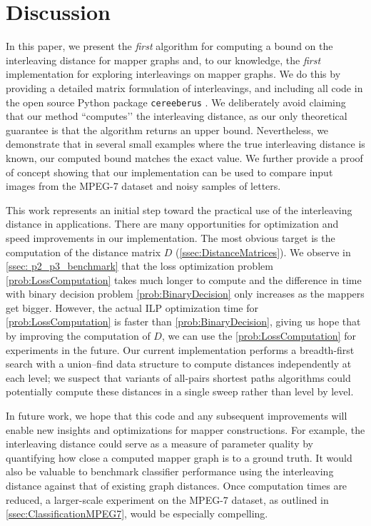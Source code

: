 \section{Discussion}
\label{sec:discussion}

In this paper, we present the \emph{first} algorithm for computing a bound on the interleaving distance for mapper graphs and, to our knowledge, the \emph{first} implementation for exploring interleavings on mapper graphs. 
We do this by providing a detailed matrix formulation of interleavings, and including all code in the open source Python package \texttt{cereeberus} \cite{cereeberus}.
We deliberately avoid claiming that our method “computes’’ the interleaving distance, as our only theoretical guarantee is that the algorithm returns an upper bound. 
Nevertheless, we demonstrate that in several small examples where the true interleaving distance is known, our computed bound matches the exact value. 
We further provide a proof of concept showing that our implementation can be used to compare input images from the MPEG-7 dataset and noisy samples of letters.

This work represents an initial step toward the practical use of the interleaving distance in applications. 
There are many opportunities for optimization and speed improvements in our implementation. 
The most obvious target is the computation of the distance matrix $D$ (\cref{ssec:DistanceMatrices}). 
We observe in \cref{ssec: p2_p3_benchmark} that the loss optimization problem \cref{prob:LossComputation} takes much longer to compute and the difference in time with binary decision problem \cref{prob:BinaryDecision} only increases as the mappers get bigger.
However, the actual ILP optimization time for \cref{prob:LossComputation} is faster than \cref{prob:BinaryDecision}, giving us hope that by improving the computation of $D$, we can use the \cref{prob:LossComputation} for experiments in the future. 
Our current implementation performs a breadth-first search with a union–find data structure to compute distances independently at each level; we suspect that variants of all-pairs shortest paths algorithms could potentially compute these distances in a single sweep rather than level by level.


In future work, we hope that this code and any subsequent improvements will enable new insights and optimizations for mapper constructions. For example, the interleaving distance could serve as a measure of parameter quality by quantifying how close a computed mapper graph is to a ground truth. 
It would also be valuable to benchmark classifier performance using the interleaving distance against that of existing graph distances. 
Once computation times are reduced, a larger-scale experiment on the MPEG-7 dataset, as outlined in \cref{ssec:ClassificationMPEG7}, would be especially compelling.

